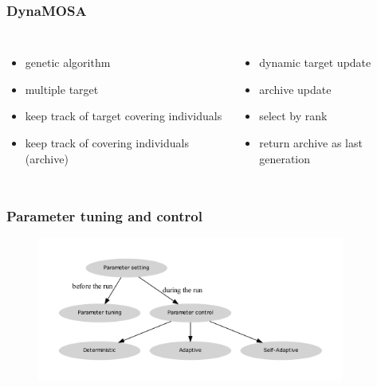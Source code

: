 \begin{frame}
	\frametitle{DynaMOSA}
	
	\begin{columns}[c]
		
		
		\begin{itemize}
			\item genetic algorithm
			\item multiple target
			\item keep track of target covering individuals
			\item keep track of covering individuals (archive)
		\end{itemize}
		
		
		\begin{itemize}
			\item dynamic target update
			\item archive update
			\item select by rank
			\item return archive as last generation
		\end{itemize}	
		
	\end{columns}
	
\end{frame}

\begin{frame}
	\frametitle{Parameter tuning and control}
	
	\begin{figure}
		\includegraphics[width=0.9\textwidth]{figures/flowchart_parameter_control}
	\end{figure}
	\cite{Eiben.1999}
	
\end{frame}